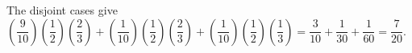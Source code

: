 The disjoint cases give $(\dfrac{9}{10})(\dfrac{1}{2})(\dfrac{2}{3})+(\dfrac{1}{10})(\dfrac{1}{2})(\dfrac{2}{3})+(\dfrac{1}{10})(\dfrac{1}{2})(\dfrac{1}{3})=\dfrac{3}{10}+\dfrac{1}{30}+\dfrac{1}{60}=\boxed{\dfrac{7}{20}}$.
